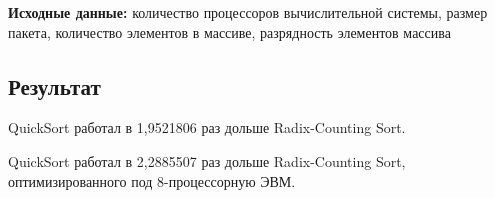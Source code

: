         \textbf{Исходные данные:} количество процессоров вычислительной системы, размер пакета, количество элементов в массиве, разрядность элементов массива
        
        
        \subsection*{Результат}
            
            QuickSort работал в 1,9521806 раз дольше Radix-Counting Sort.
            
            QuickSort работал в 2,2885507 раз дольше Radix-Counting Sort, оптимизированного под 8-процессорную ЭВМ.